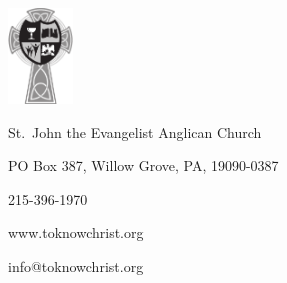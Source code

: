 \documentclass[00-main.tex]{subfiles}
\begin{document}
\pagestyle{empty}

\clearpage

\vfill

\begin{center}
\includegraphics[height=1in]{SJEAC-logo-gray.pdf}
\end{center}

\vfill

\begin{center}
\begin{minipage}{3in}
\begin{center}
St.\ John the Evangelist Anglican Church

PO Box 387, Willow Grove, PA, 19090-0387

215-396-1970

www.toknowchrist.org

info@toknowchrist.org
\end{center}
\end{minipage}
\end{center}

\vfill
\end{document}
